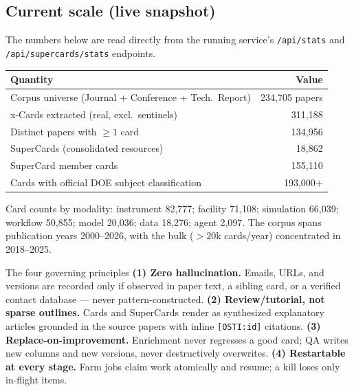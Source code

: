 \documentclass[11pt,letterpaper]{article}
\newcommand{\code}[1]{\texttt{\small #1}}
\begin{document}
\subsection{Current scale (live snapshot)}

The numbers below are read directly from the running service's
\code{/api/stats} and \code{/api/supercards/stats} endpoints.

\begin{center}
\small
\begin{tabular}{@{}l r@{}}
\toprule
\textbf{Quantity} & \textbf{Value} \\
\midrule
Corpus universe (Journal + Conference + Tech.\ Report) & 234{,}705 papers \\
x-Cards extracted (real, excl.\ sentinels)             & 311{,}188 \\
Distinct papers with $\geq 1$ card                     & 134{,}956 \\
SuperCards (consolidated resources)                    & 18{,}862 \\
SuperCard member cards                                 & 155{,}110 \\
Cards with official DOE subject classification         & 193{,}000+ \\
\bottomrule
\end{tabular}
\end{center}

\noindent Card counts by modality: instrument 82{,}777; facility 71{,}108;
simulation 66{,}039; workflow 50{,}855; model 20{,}036; data 18{,}276; agent 2{,}097.
The corpus spans publication years 2000--2026, with the bulk (${>}20$k cards/year)
concentrated in 2018--2025.

\begin{rulebox}{The four governing principles}
\textbf{(1) Zero hallucination.} Emails, URLs, and versions are recorded only if
observed in paper text, a sibling card, or a verified contact database --- never
pattern-constructed.
\textbf{(2) Review/tutorial, not sparse outlines.} Cards and SuperCards render as
synthesized explanatory articles grounded in the source papers with inline
\code{[OSTI:id]} citations.
\textbf{(3) Replace-on-improvement.} Enrichment never regresses a good card; QA
writes new columns and new versions, never destructively overwrites.
\textbf{(4) Restartable at every stage.} Farm jobs claim work atomically and resume;
a kill loses only in-flight items.
\end{rulebox}

\clearpage
\end{document}
